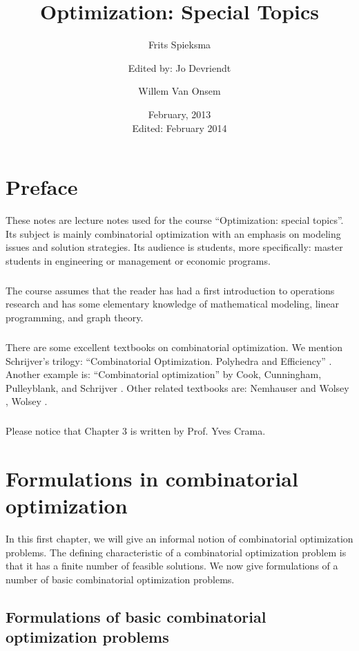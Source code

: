 \documentclass[titlepage]{book}
\title{Optimization: Special Topics}
\author{Frits Spieksma\and Edited by: Jo Devriendt \and Willem Van Onsem}
\date{February, 2013\\Edited: February 2014}
\begin{document}
\begin{titlepage}
\maketitle
\end{titlepage}
\tableofcontents
\chapter*{Preface}
These notes are lecture notes used for the course ``Optimization: special topics''. Its subject is mainly combinatorial optimization with an emphasis on modeling issues and solution strategies. Its audience is students, more specifically: master students in engineering or management or economic programs.
\paragraph{}
The course assumes that the reader has had a first introduction to operations research and has some elementary knowledge of mathematical modeling, linear programming, and graph theory.
\paragraph{}
There are some excellent textbooks on combinatorial optimization. We mention Schrijver's trilogy: ``Combinatorial Optimization. Polyhedra and Efficiency'' \cite{schrijver-book}. Another example is: ``Combinatorial optimization'' by Cook, Cunningham, Pulleyblank, and Schrijver \cite{Cook:98}. Other related textbooks are: Nemhauser and Wolsey \cite{citeulike:2212037}, Wolsey \cite{wolseyip}.
\paragraph{}
Please notice that Chapter 3 is written by Prof. Yves Crama.

\chapter{Formulations in combinatorial optimization}
In this first chapter, we will give an informal notion of combinatorial optimization problems. The defining
characteristic of a combinatorial optimization problem is that it has a finite number of feasible solutions.
We now give formulations of a number of basic combinatorial optimization problems.

\section{Formulations of basic combinatorial optimization problems}
\end{document}
